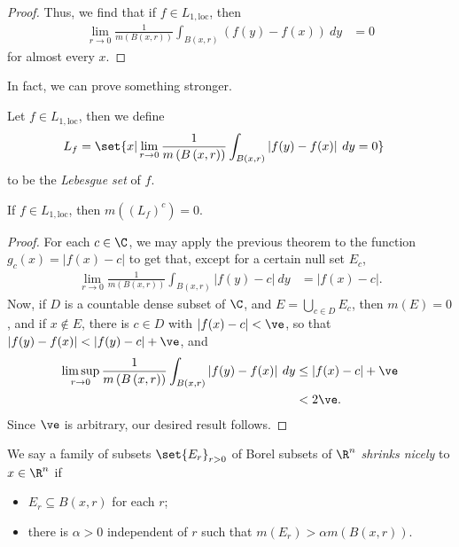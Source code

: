 \documentclass[10pt]{mypackage}
\begin{document}
\begin{proof}
  Thus, we find that if $f\in L_{1,\text{loc}}$, then
  \begin{align*}
    \lim_{r\rightarrow 0} \frac{1}{m\left( B\left( x,r \right) \right)} \int_{B\left( x,r \right)}^{} \left( f(y)-f(x) \right)\:dy &= 0
  \end{align*}
  for almost every $x$.
\end{proof}
 In fact, we can prove something stronger.
 \begin{definition}
   Let $f\in L_{1,\text{loc}}$, then we define
   \begin{align*}
     L_{f} &= \set{x | \lim_{r\rightarrow 0}\frac{1}{m\left( B\left( x,r \right) \right)} \int_{B\left( x,r \right)}^{} \left\vert f(y)-f(x) \right\vert\:dy = 0}
   \end{align*}
   to be the \textit{Lebesgue set} of $f$.
 \end{definition}
 \begin{theorem}
   If $f\in L_{1,\text{loc}}$, then $m\left( \left( L_f \right)^{c} \right) = 0$.
 \end{theorem}
 \begin{proof}
   For each $c\in \C$, we may apply the previous theorem to the function $g_c(x) = \left\vert f(x)-c \right\vert$ to get that, except for a certain null set $E_c$,
   \begin{align*}
     \lim_{r\rightarrow 0} \frac{1}{m\left( B\left( x,r \right) \right)} \int_{B\left( x,r \right)}^{} \left\vert f(y)-c \right\vert\:dy &= \left\vert f(x)-c \right\vert.
   \end{align*}
   Now, if $D$ is a countable dense subset of $\C$, and $E = \bigcup_{c\in D}E_c$, then $m(E) = 0$, and if $x\notin E$, there is $c\in D$ with $\left\vert f(x)-c \right\vert < \ve$, so that $\left\vert f(y)-f(x) \right\vert < \left\vert f(y)-c \right\vert + \ve$, and
   \begin{align*}
     \limsup_{r\rightarrow 0} \frac{1}{m\left( B\left( x,r \right) \right)} \int_{B\left( x,r \right)}^{} \left\vert f(y)-f(x) \right\vert\:dy &\leq \left\vert f(x)-c \right\vert + \ve\\
                                                                                                                                                       &< 2\ve.
   \end{align*}
   Since $\ve$ is arbitrary, our desired result follows.
 \end{proof}
 \begin{definition}
   We say a family of subsets $\set{E_r}_{r > 0}$ of Borel subsets of $\R^n$ \textit{shrinks nicely} to $x\in \R^n$ if
   \begin{itemize}
     \item $E_r\subseteq B\left( x,r \right)$ for each $r$;
      \item there is $\alpha > 0$ independent of $r$ such that $m\left( E_r \right) > \alpha m\left( B\left( x,r \right) \right)$.
   \end{itemize}
 \end{definition}
\end{document}
